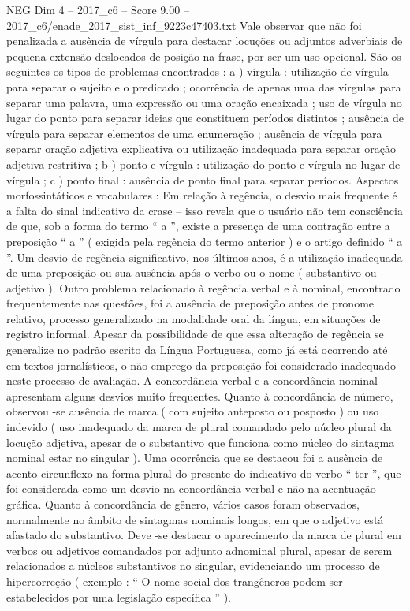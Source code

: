 \begin{textsample}{NEG Dim 4 – 2017\_c6 – Score 9.00 – 2017\_c6/enade\_2017\_sist\_inf\_9223c47403.txt}
Vale observar que não foi penalizada a ausência de vírgula para destacar locuções ou adjuntos adverbiais de pequena extensão deslocados de posição na frase, por ser um uso opcional.
São os seguintes os tipos de problemas encontrados : a ) vírgula : utilização de vírgula para separar o sujeito e o predicado ; ocorrência de apenas uma das vírgulas para separar uma palavra, uma expressão ou uma oração encaixada ; uso de vírgula no lugar do ponto para separar ideias que constituem períodos distintos ; ausência de vírgula para separar elementos de uma enumeração ; ausência de vírgula para separar oração adjetiva explicativa ou utilização inadequada para separar oração adjetiva restritiva ; b ) ponto e vírgula : utilização do ponto e vírgula no lugar de vírgula ; c ) ponto final : ausência de ponto final para separar períodos.
Aspectos morfossintáticos e vocabulares : Em relação à regência, o desvio mais frequente é a falta do sinal indicativo da crase – isso revela que o usuário não tem consciência de que, sob a forma do termo “ a ”, existe a presença de uma contração entre a preposição “ a ” ( exigida pela regência do termo anterior ) e o artigo definido “ a ”.
Um desvio de regência significativo, nos últimos anos, é a utilização inadequada de uma preposição ou sua ausência após o verbo ou o nome ( substantivo ou adjetivo ).
Outro problema relacionado à regência verbal e à nominal, encontrado frequentemente nas questões, foi a ausência de preposição antes de pronome relativo, processo generalizado na modalidade oral da língua, em situações de registro informal.
Apesar da possibilidade de que essa alteração de regência se generalize no padrão escrito da Língua Portuguesa, como já está ocorrendo até em textos jornalísticos, o não emprego da preposição foi considerado inadequado neste processo de avaliação.
A concordância verbal e a concordância nominal apresentam alguns desvios muito frequentes.
Quanto à concordância de número, observou -se ausência de marca ( com sujeito anteposto ou posposto ) ou uso indevido ( uso inadequado da marca de plural comandado pelo núcleo plural da locução adjetiva, apesar de o substantivo que funciona como núcleo do sintagma nominal estar no singular ).
Uma ocorrência que se destacou foi a ausência de acento circunflexo na forma plural do presente do indicativo do verbo “ ter ”, que foi considerada como um desvio na concordância verbal e não na acentuação gráfica.
Quanto à concordância de gênero, vários casos foram observados, normalmente no âmbito de sintagmas nominais longos, em que o adjetivo está afastado do substantivo.
Deve -se destacar o aparecimento da marca de plural em verbos ou adjetivos comandados por adjunto adnominal plural, apesar de serem relacionados a núcleos substantivos no singular, evidenciando um processo de hipercorreção ( exemplo : “ O nome social dos trangêneros podem ser estabelecidos por uma legislação específica ” ).

\end{textsample}
